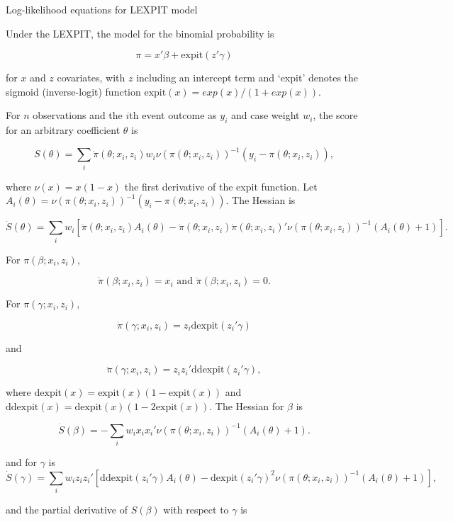 \documentclass{article}
\begin{document}
\begin{center}
Log-likelihood equations for LEXPIT model
\end{center}

Under the LEXPIT, the model for the binomial probability is

\[
\pi = x'\beta+\mbox{expit}(z'\gamma)
\]

\noindent for $x$ and $z$ covariates, with $z$ including an intercept term and `expit' denotes the sigmoid (inverse-logit) function $\mbox{expit}(x) = exp(x)/(1+exp(x))$.

For $n$ observations and the $i$th event outcome as $y_i$ and case weight $w_i$, the score for an arbitrary coefficient $\theta$ is

\[
S(\theta) = \sum_i \dot{\pi}(\theta;x_i,z_i) w_i \nu (\pi(\theta;x_i,z_i))^{-1}(y_i - \pi(\theta;x_i,z_i)),
\]

\noindent where $\nu(x) = x(1-x)$ the first derivative of the expit function. Let $A_i(\theta) = \nu(\pi(\theta;x_i,z_i))^{-1}(y_i - \pi(\theta;x_i,z_i))$. The Hessian is 

\[
\dot{S}(\theta) = \sum_i w_i \left[ \ddot{\pi}(\theta;x_i,z_i) A_i(\theta) -\dot{\pi}(\theta;x_i,z_i) \dot{\pi}(\theta;x_i,z_i)' \nu(\pi(\theta;x_i,z_i))^{-1} ( A_i(\theta) + 1 ) \right].
\]

\noindent For $\pi(\beta;x_i,z_i)$, 

\[
\dot{\pi}(\beta;x_i,z_i) = x_i \mbox{ and } \ddot{\pi}(\beta;x_i,z_i) = 0.
\]

\noindent For $\pi(\gamma;x_i,z_i)$, 

\[
\dot{\pi}(\gamma;x_i,z_i) = z_i \mbox{dexpit}(z_i'\gamma)
\]

\noindent and
 
\[
\ddot{\pi}(\gamma;x_i,z_i) = z_iz_i' \mbox{ddexpit}(z_i'\gamma),
\]

\noindent where $\mbox{dexpit}(x) = \mbox{expit}(x) (1- \mbox{expit}(x))$ and $\mbox{ddexpit}(x) = \mbox{dexpit}(x) (1-2 \mbox{expit}(x))$. The Hessian for $\beta$ is


\[
\dot{S}(\beta) = - \sum_i w_i x_i x_i' \nu(\pi(\theta;x_i,z_i))^{-1} ( A_i(\theta) + 1 ).
\]

\noindent and for $\gamma$ is 
\[
\dot{S}(\gamma) = \sum_i w_i z_i z_i' \left[  \mbox{ddexpit}(z_i'\gamma) A_i(\theta) -\mbox{dexpit}(z_i'\gamma)^2 \nu(\pi(\theta;x_i,z_i))^{-1} ( A_i(\theta) + 1 ) \right],
\]

\noindent and the partial derivative of $S(\beta)$ with respect to $\gamma$ is
\end{document}
